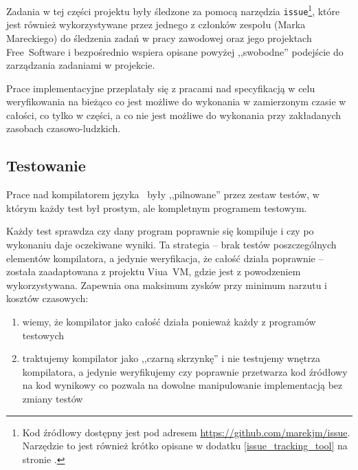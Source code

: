 Zadania w tej części projektu były śledzone za pomocą narzędzia
\texttt{issue}\footnote{Kod źródłowy dostępny jest pod adresem
\url{https://github.com/marekjm/issue}. Narzędzie to jest również krótko opisane
w dodatku \ref{issue_tracking_tool} na stronie \pageref{issue_tracking_tool}.},
które jest również wykorzystywane przez jednego z członków zespołu (Marka
Mareckiego) do śledzenia zadań w pracy zawodowej oraz jego projektach
Free~Software i bezpośrednio wspiera opisane powyżej ,,swobodne'' podejście do
zarządzania zadaniami w projekcie.

Prace implementacyjne przeplatały się z pracami nad specyfikacją w celu
weryfikowania na bieżąco co jest możliwe do wykonania w zamierzonym czasie w
całości, co tylko w części, a co nie jest możliwe do wykonania przy zakładanych
zasobach czasowo-ludzkich.

\subsection{Testowanie}

Prace nad kompilatorem języka \ViuAct\ były ,,pilnowane'' przez zestaw testów, w
którym każdy test był prostym, ale kompletnym programem testowym.

Każdy test sprawdza czy dany program poprawnie się kompiluje i czy po wykonaniu
daje oczekiwane wyniki. Ta strategia -- brak testów poszczególnych elementów
kompilatora, a jedynie weryfikacja, że całość działa poprawnie -- została
zaadaptowana z projektu Viua~VM, gdzie jest z powodzeniem wykorzystywana.
Zapewnia ona maksimum zysków przy minimum narzutu i kosztów czasowych:

\begin{enumerate}
    \item wiemy, że kompilator jako całość działa ponieważ każdy z programów
        testowych
    \item traktujemy kompilator jako ,,czarną skrzynkę'' i nie testujemy wnętrza
        kompilatora, a jedynie weryfikujemy czy poprawnie przetwarza kod
        źródłowy na kod wynikowy co pozwala na dowolne manipulowanie
        implementacją bez zmiany testów
\end{enumerate}

